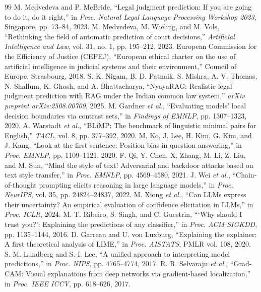 \documentclass[conference]{IEEEtran}
\begin{document}
\begin{thebibliography}{99}
 M. Medvedeva and P. McBride, ``Legal judgment prediction: If you are going to do it, do it right,'' in \textit{Proc. Natural Legal Language Processing Workshop 2023}, Singapore, pp. 73--84, 2023.
 M. Medvedeva, M. Wieling, and M. Vols, ``Rethinking the field of automatic prediction of court decisions,'' \textit{Artificial Intelligence and Law}, vol. 31, no. 1, pp. 195--212, 2023.
 European Commission for the Efficiency of Justice (CEPEJ), ``European ethical charter on the use of artificial intelligence in judicial systems and their environment,'' Council of Europe, Strasbourg, 2018.
 S. K. Nigam, B. D. Patnaik, S. Mishra, A. V. Thomas, N. Shallum, K. Ghosh, and A. Bhattacharya, ``NyayaRAG: Realistic legal judgment prediction with RAG under the Indian common law system,'' \textit{arXiv preprint arXiv:2508.00709}, 2025.
 M. Gardner \textit{et al.}, ``Evaluating models' local decision boundaries via contrast sets,'' in \textit{Findings of EMNLP}, pp. 1307--1323, 2020.
 A. Warstadt \textit{et al.}, ``BLiMP: The benchmark of linguistic minimal pairs for English,'' \textit{TACL}, vol. 8, pp. 377--392, 2020.
 M. Ko, J. Lee, H. Kim, G. Kim, and J. Kang, ``Look at the first sentence: Position bias in question answering,'' in \textit{Proc. EMNLP}, pp. 1109--1121, 2020.
 F. Qi, Y. Chen, X. Zhang, M. Li, Z. Liu, and M. Sun, ``Mind the style of text! Adversarial and backdoor attacks based on text style transfer,'' in \textit{Proc. EMNLP}, pp. 4569--4580, 2021.
 J. Wei \textit{et al.}, ``Chain-of-thought prompting elicits reasoning in large language models,'' in \textit{Proc. NeurIPS}, vol. 35, pp. 24824--24837, 2022.
 M. Xiong \textit{et al.}, ``Can LLMs express their uncertainty? An empirical evaluation of confidence elicitation in LLMs,'' in \textit{Proc. ICLR}, 2024.
 M. T. Ribeiro, S. Singh, and C. Guestrin, ```Why should I trust you?': Explaining the predictions of any classifier,'' in \textit{Proc. ACM SIGKDD}, pp. 1135--1144, 2016.
 D. Garreau and U. von Luxburg, ``Explaining the explainer: A first theoretical analysis of LIME,'' in \textit{Proc. AISTATS}, PMLR vol. 108, 2020.
 S. M. Lundberg and S.-I. Lee, ``A unified approach to interpreting model predictions,'' in \textit{Proc. NIPS}, pp. 4765--4774, 2017.
 R. R. Selvaraju \textit{et al.}, ``Grad-CAM: Visual explanations from deep networks via gradient-based localization,'' in \textit{Proc. IEEE ICCV}, pp. 618--626, 2017.

\end{thebibliography}
\end{document}
